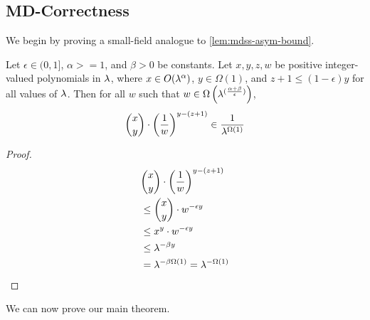 \subsection{MD-Correctness}
We begin by proving a small-field analogue to \cref{lem:mdss-asym-bound}.
\begin{lemma}
	\label{lem:gs-sf-asym-bound}
	Let $\epsilon \in (0, 1]$, $\alpha >= 1$, and $\beta > 0$ be constants.
	Let $x, y, z, w$ be positive integer-valued polynomials in $\lambda$, where $x \in O(\lambda^\alpha)$, $y \in \Omega(1)$, and $z + 1 \leq (1 - \epsilon)y$ for all values of $\lambda$.
	Then for all $w$ such that $w \in \Omega\left(\lambda^{(\frac{\alpha + \beta}{\epsilon})}\right)$,
	$$
		\binom{x}{y} \cdot \left(\frac{1}{w}\right)^{y - (z + 1)} \in \frac{1}{\lambda^{\Omega(1)}}
	$$
\end{lemma}
\begin{proof}
	\begin{align*}
		 & \binom{x}{y} \cdot \left(\frac{1}{w}\right)^{y - (z + 1)} \\
		 & \leq \binom{x}{y} \cdot w^{-\epsilon y}                   \\
		 & \leq x^y \cdot w^{-\epsilon y}                            \\
		 & \leq \lambda^{-\beta y}                                   \\
		 & = \lambda^{-\beta \Omega(1)}  = \lambda^{-\Omega(1)}
	\end{align*}
\end{proof}

We can now prove our main theorem.

